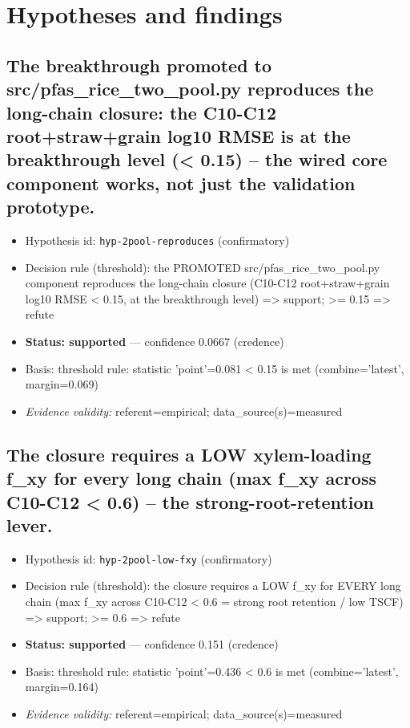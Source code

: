 \documentclass{article}
\begin{document}
\section{Hypotheses and findings}

\subsection{The breakthrough promoted to src/pfas\_rice\_two\_pool.py reproduces the long-chain closure: the C10-C12 root+straw+grain log10 RMSE is at the breakthrough level (< 0.15) -- the wired core component works, not just the validation prototype.}
\begin{itemize}
  \item Hypothesis id: \texttt{hyp-2pool-reproduces} (confirmatory)
  \item Decision rule (threshold): the PROMOTED src/pfas\_rice\_two\_pool.py component reproduces the long-chain closure (C10-C12 root+straw+grain log10 RMSE < 0.15, at the breakthrough level) => support; >= 0.15 => refute
  \item \textbf{Status: supported} --- confidence 0.0667 (credence)
  \item Basis: threshold rule: statistic 'point'=0.081 < 0.15 is met (combine='latest', margin=0.069)
  \item \textit{Evidence validity:} referent=empirical; data\_source(s)=measured
\end{itemize}

\subsection{The closure requires a LOW xylem-loading f\_xy for every long chain (max f\_xy across C10-C12 < 0.6) -- the strong-root-retention lever.}
\begin{itemize}
  \item Hypothesis id: \texttt{hyp-2pool-low-fxy} (confirmatory)
  \item Decision rule (threshold): the closure requires a LOW f\_xy for EVERY long chain (max f\_xy across C10-C12 < 0.6 = strong root retention / low TSCF) => support; >= 0.6 => refute
  \item \textbf{Status: supported} --- confidence 0.151 (credence)
  \item Basis: threshold rule: statistic 'point'=0.436 < 0.6 is met (combine='latest', margin=0.164)
  \item \textit{Evidence validity:} referent=empirical; data\_source(s)=measured
\end{itemize}
\end{document}
